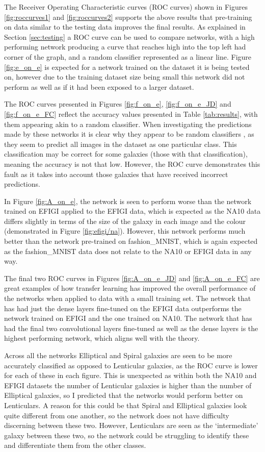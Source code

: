 \documentclass[12pt, onecolumn]{aa}
\begin{document}
The Receiver Operating Characteristic curves (ROC curves) shown in Figures \ref{fig:roccurves1} and \ref{fig:roccurves2} supports the above results that pre-training on data similar to the testing data improves the final results. As explained in Section \ref{sec:testing} a ROC curve can be used to compare networks, with a high performing network producing a curve that reaches high into the top left had corner of the graph, and a random classifier represented as a linear line. Figure \ref{fig:e_on_e} is expected for a network trained on the dataset it is being tested on, however due to the training dataset size being small this network did not perform as well as if it had been exposed to a larger dataset. 

The ROC curves presented in Figures \ref{fig:f_on_e}, \ref{fig:f_on_e_JD} and \ref{fig:f_on_e_FC} reflect the accuracy values presented in Table \ref{tab:results}, with them appearing akin to a random classifier. When investigating the predictions made by these networks it is clear why they appear to be random classifiers , as they seem to predict all images in the dataset as one particular class. This classification may be correct for some galaxies (those with that classification), meaning the accuracy is not that low. However, the ROC curve demonstrates this fault as it takes into account those galaxies that have received incorrect predictions.

In Figure \ref{fig:A_on_e}, the network is seen to perform worse than the network trained on EFIGI applied to the EFIGI data, which is expected as the NA10 data differs slightly in terms of the size of the galaxy in each image and the colour (demonstrated in Figure \ref{fig:efigi/na}). However, this network performs much better than the network pre-trained on fashion\_MNIST, which is again expected as the fashion\_MNIST data does not relate to the NA10 or EFIGI data in any way. 

The final two ROC curves in Figures \ref{fig:A_on_e_JD} and \ref{fig:A_on_e_FC} are great examples of how transfer learning has improved the overall performance of the networks when applied to data with a small training set. The network that has had just the dense layers fine-tuned on the EFIGI data outperforms the network trained on EFIGI and the one trained on NA10. The network that has had the final two convolutional layers fine-tuned as well as the dense layers is the highest performing network, which aligns well with the theory.

Across all the networks Elliptical and Spiral galaxies are seen to be more accurately classified as opposed to Lenticular galaxies, as the ROC curve is lower for each of these in each figure. This is unexpected as within both the NA10 and EFIGI datasets the number of Lenticular galaxies is higher than the number of Elliptical galaxies, so I predicted that the networks would perform better on Lenticulars. A reason for this could be that Spiral and Elliptical galaxies look quite different from one another, so the network does not have difficulty discerning between these two. However, Lenticulars are seen as the ‘intermediate’ galaxy between these two, so the network could be struggling to identify these and differentiate them from the other classes.
\end{document}
